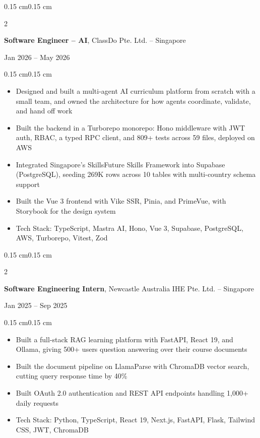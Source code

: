 \documentclass[10pt, letterpaper]{article}
\newenvironment{highlights}{
    \begin{itemize}[
        topsep=0.08 cm,
        parsep=0.05 cm,
        partopsep=0pt,
        itemsep=0pt,
        leftmargin=0.4 cm
    ]
}{
    \end{itemize}
}
\newenvironment{onecolentry}{
    \begin{adjustwidth}{0.15 cm}{0.15 cm}
}{
    \end{adjustwidth}
}
\newenvironment{twocolentry}[2][]{
    \onecolentry
    \def\secondColumn{#2}
    \setcolumnwidth{\fill, 4.5 cm}
    \begin{paracol}{2}
}{
    \switchcolumn \raggedleft \secondColumn
    \end{paracol}
    \endonecolentry
}
\begin{document}
        \begin{twocolentry}{
            Jan 2026 -- May 2026
        }
            \textbf{Software Engineer -- AI}, ClassDo Pte. Ltd. -- Singapore
        \end{twocolentry}
        \vspace{0.08 cm}
        \begin{onecolentry}
            \begin{highlights}
                \item Designed and built a multi-agent AI curriculum platform from scratch with a small team, and owned the architecture for how agents coordinate, validate, and hand off work
                \item Built the backend in a Turborepo monorepo: Hono middleware with JWT auth, RBAC, a typed RPC client, and 809+ tests across 59 files, deployed on AWS
                \item Integrated Singapore's SkillsFuture Skills Framework into Supabase (PostgreSQL), seeding 269K rows across 10 tables with multi-country schema support
                \item Built the Vue 3 frontend with Vike SSR, Pinia, and PrimeVue, with Storybook for the design system
                \item Tech Stack: TypeScript, Mastra AI, Hono, Vue 3, Supabase, PostgreSQL, AWS, Turborepo, Vitest, Zod
            \end{highlights}
        \end{onecolentry}

        \vspace{0.15 cm}

        \begin{twocolentry}{
            Jan 2025 -- Sep 2025
        }
            \textbf{Software Engineering Intern}, Newcastle Australia IHE Pte. Ltd. -- Singapore
        \end{twocolentry}
        \vspace{0.08 cm}
        \begin{onecolentry}
            \begin{highlights}
                \item Built a full-stack RAG learning platform with FastAPI, React 19, and Ollama, giving 500+ users question answering over their course documents
                \item Built the document pipeline on LlamaParse with ChromaDB vector search, cutting query response time by 40\%
                \item Built OAuth 2.0 authentication and REST API endpoints handling 1,000+ daily requests
                \item Tech Stack: Python, TypeScript, React 19, Next.js, FastAPI, Flask, Tailwind CSS, JWT, ChromaDB
            \end{highlights}
        \end{onecolentry}
\end{document}
